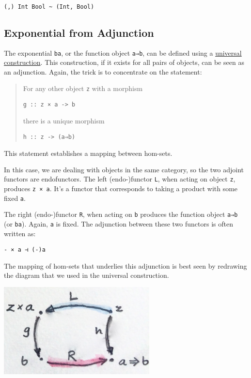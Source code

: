 \begin{verbatim}
(,) Int Bool ~ (Int, Bool)
\end{verbatim}

\subsection{Exponential from
Adjunction}\label{exponential-from-adjunction}

The exponential \texttt{ba}, or the function object \texttt{a⇒b}, can be
defined using a
\href{https://bartoszmilewski.com/2015/03/13/function-types/}{universal
construction}. This construction, if it exists for all pairs of objects,
can be seen as an adjunction. Again, the trick is to concentrate on the
statement:

\begin{quote}
For any other object \texttt{z} with a morphism

\begin{verbatim}
g :: z × a -> b
\end{verbatim}

there is a unique morphism

\begin{verbatim}
h :: z -> (a⇒b)
\end{verbatim}
\end{quote}

This statement establishes a mapping between hom-sets.

In this case, we are dealing with objects in the same category, so the
two adjoint functors are endofunctors. The left (endo-)functor
\texttt{L}, when acting on object \texttt{z}, produces \texttt{z\ ×\ a}.
It's a functor that corresponds to taking a product with some fixed
\texttt{a}.

The right (endo-)functor \texttt{R}, when acting on \texttt{b} produces
the function object \texttt{a⇒b} (or \texttt{ba}). Again, \texttt{a} is
fixed. The adjunction between these two functors is often written as:

\begin{verbatim}
- × a ⊣ (-)a
\end{verbatim}

The mapping of hom-sets that underlies this adjunction is best seen by
redrawing the diagram that we used in the universal construction.

\includegraphics[width=3.12500in]{images/adj-expo.jpg}

